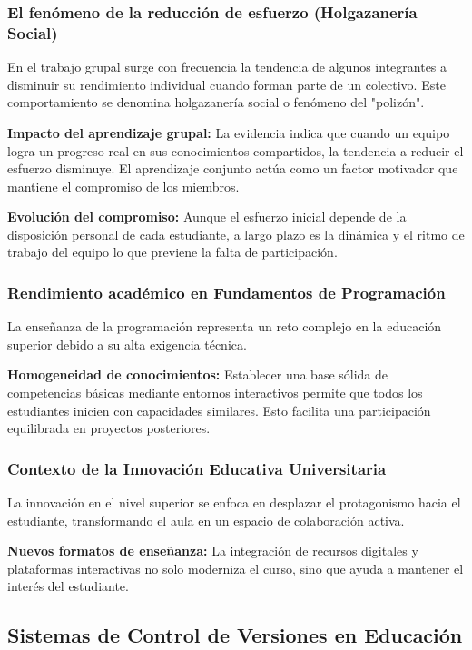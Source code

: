 \documentclass[12pt,a4paper]{article}
\begin{document}
\subsubsection{El fenómeno de la reducción de esfuerzo (Holgazanería Social)}
En el trabajo grupal surge con frecuencia la tendencia de algunos integrantes a disminuir su rendimiento individual cuando forman parte de un colectivo. Este comportamiento se denomina holgazanería social o fenómeno del "polizón".\cite{gabelica2022}

\textbf{Impacto del aprendizaje grupal:} La evidencia indica que cuando un equipo logra un progreso real en sus conocimientos compartidos, la tendencia a reducir el esfuerzo disminuye. El aprendizaje conjunto actúa como un factor motivador que mantiene el compromiso de los miembros.

\textbf{Evolución del compromiso:} Aunque el esfuerzo inicial depende de la disposición personal de cada estudiante, a largo plazo es la dinámica y el ritmo de trabajo del equipo lo que previene la falta de participación.

\subsubsection{Rendimiento académico en Fundamentos de Programación}
La enseñanza de la programación representa un reto complejo en la educación superior debido a su alta exigencia técnica.\cite{narvaez2023}

\textbf{Homogeneidad de conocimientos:} Establecer una base sólida de competencias básicas mediante entornos interactivos permite que todos los estudiantes inicien con capacidades similares. Esto facilita una participación equilibrada en proyectos posteriores.

\subsubsection{Contexto de la Innovación Educativa Universitaria}
La innovación en el nivel superior se enfoca en desplazar el protagonismo hacia el estudiante, transformando el aula en un espacio de colaboración activa.\cite{luceno2024}

\textbf{Nuevos formatos de enseñanza:} La integración de recursos digitales y plataformas interactivas no solo moderniza el curso, sino que ayuda a mantener el interés del estudiante.

\subsection{Sistemas de Control de Versiones en Educación}
\end{document}
